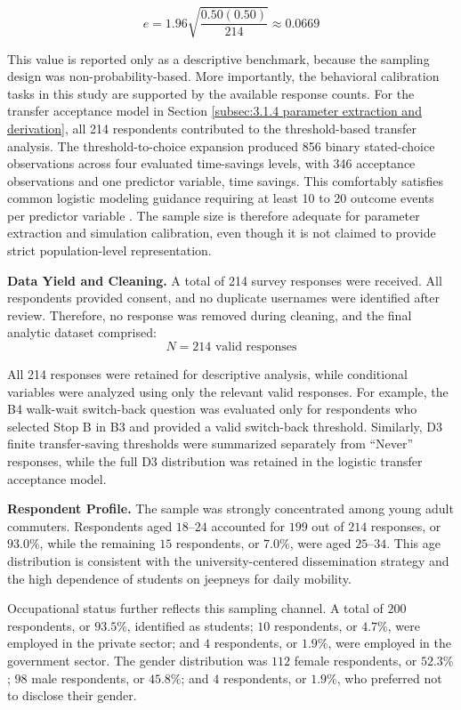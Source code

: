 {\[
e = 1.96 \sqrt{\frac{0.50(0.50)}{214}}
\approx 0.0669
\]

This value is reported only as a descriptive benchmark, because the sampling design was non-probability-based. More importantly, the behavioral calibration tasks in this study are supported by the available response counts. For the transfer acceptance model in Section \ref{subsec:3.1.4 parameter extraction and derivation}, all 214 respondents contributed to the threshold-based transfer analysis. The threshold-to-choice expansion produced 856 binary stated-choice observations across four evaluated time-savings levels, with 346 acceptance observations and one predictor variable, time savings. This comfortably satisfies common logistic modeling guidance requiring at least 10 to 20 outcome events per predictor variable \citep{peduzzi1996simulation}. The sample size is therefore adequate for parameter extraction and simulation calibration, even though it is not claimed to provide strict population-level representation.

\indent\textbf{Data Yield and Cleaning.} A total of 214 survey responses were received. All respondents provided consent, and no duplicate usernames were identified after review. Therefore, no response was removed during cleaning, and the final analytic dataset comprised:
\[
N = 214 \text{ valid responses}
\]

All 214 responses were retained for descriptive analysis, while conditional variables were analyzed using only the relevant valid responses. For example, the B4 walk-wait switch-back question was evaluated only for respondents who selected Stop B in B3 and provided a valid switch-back threshold. Similarly, D3 finite transfer-saving thresholds were summarized separately from “Never” responses, while the full D3 distribution was retained in the logistic transfer acceptance model.

\indent\textbf{Respondent Profile.} The sample was strongly concentrated among young adult commuters. Respondents aged \(18\text{--}24\) accounted for \(199\) out of \(214\) responses, or \(93.0\%\), while the remaining \(15\) respondents, or \(7.0\%\), were aged \(25\text{--}34\). This age distribution is consistent with the university-centered dissemination strategy and the high dependence of students on jeepneys for daily mobility.

Occupational status further reflects this sampling channel. A total of \(200\) respondents, or \(93.5\%\), identified as students; \(10\) respondents, or \(4.7\%\), were employed in the private sector; and \(4\) respondents, or \(1.9\%\), were employed in the government sector. The gender distribution was \(112\) female respondents, or \(52.3\%\); \(98\) male respondents, or \(45.8\%\); and \(4\) respondents, or \(1.9\%\), who preferred not to disclose their gender.

}
